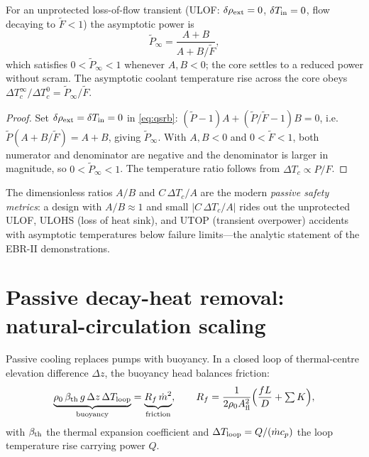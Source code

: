 \begin{proposition}
\label{prop:ulof}
For an unprotected loss-of-flow transient (ULOF: $\delta\rho_{\rm ext}=0$,
$\delta T_{\rm in}=0$, flow decaying to $\tilde F<1$) the asymptotic power is
\begin{equation}
\tilde P_\infty=\frac{A+B}{A+B/\tilde F},
\end{equation}
which satisfies $0<\tilde P_\infty<1$ whenever $A,B<0$; the core settles to a
reduced power without scram. The asymptotic coolant temperature rise across the
core obeys $\Delta T_c^\infty/\Delta T_c^0=\tilde P_\infty/\tilde F$.
\end{proposition}
\begin{proof}
Set $\delta\rho_{\rm ext}=\delta T_{\rm in}=0$ in \eqref{eq:qsrb}:
$(\tilde P-1)A+(\tilde P/\tilde F-1)B=0$, i.e.\ $\tilde P(A+B/\tilde F)=A+B$, giving
$\tilde P_\infty$. With $A,B<0$ and $0<\tilde F<1$, both numerator and denominator
are negative and the denominator is larger in magnitude, so
$0<\tilde P_\infty<1$. The temperature ratio follows from
$\Delta T_c\propto P/F$.
\end{proof}

The dimensionless ratios $A/B$ and $C\,\Delta T_c/A$ are the modern \emph{passive
safety metrics}: a design with $A/B\approx1$ and small $|C\,\Delta T_c/A|$ rides
out the unprotected ULOF, ULOHS (loss of heat sink), and UTOP (transient
overpower) accidents with asymptotic temperatures below failure limits---the
analytic statement of the EBR-II demonstrations.

\section{Passive decay-heat removal: natural-circulation scaling}
\label{sec:natcirc}

Passive cooling replaces pumps with buoyancy. In a closed loop of thermal-centre
elevation difference $\Delta z$, the buoyancy head balances friction:
\begin{equation}
\underbrace{\rho_0\,\beta_{\rm th}\,g\,\Delta z\,\Delta T_{\rm loop}}_{\text{buoyancy}}
=\underbrace{R_f\,\dot m^2}_{\text{friction}},\qquad
R_f=\frac{1}{2\rho_0 A_{\rm fl}^2}\Big(\frac{fL}{D}+\textstyle\sum K\Big),
\end{equation}
with $\beta_{\rm th}$ the thermal expansion coefficient and
$\Delta T_{\rm loop}=Q/(\dot m c_p)$ the loop temperature rise carrying power $Q$.

